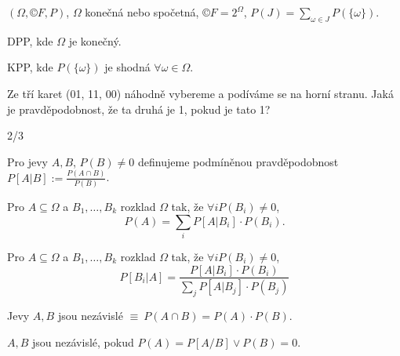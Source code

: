 \documentclass[12pt]{article}					%
\begin{document}
    \begin{definice}
        $(\Omega, ©F, P)$, $\Omega$ konečná nebo spočetná, $©F = 2^{\Omega}$, $P(J) = \sum_{\omega \in J} P(\{\omega\})$.
    \end{definice}

    \begin{definice}[Konečný PP]
        DPP, kde $\Omega$ je konečný.
    \end{definice}

    \begin{definice}[Klasický PP]
        KPP, kde $P(\{\omega\})$ je shodná $\forall \omega \in \Omega$.
    \end{definice}


    \begin{priklad}
        Ze tří karet (01, 11, 00) náhodně vybereme a podíváme se na horní stranu. Jaká je pravděpodobnost, že ta druhá je 1, pokud je tato 1?
        \begin{reseni}
            2/3
        \end{reseni}
    \end{priklad}

    \begin{definice}
        Pro jevy $A, B$, $P(B) ≠ 0$ definujeme podmíněnou pravděpodobnost $P[A|B] := \frac{P(A \cap B)}{P(B)}$.
    \end{definice}

    \begin{veta}
        Pro $A \subseteq \Omega$ a $B_1, …, B_k$ rozklad $\Omega$ tak, že $\forall i P(B_i) ≠ 0$,
        $$ P(A) = \sum_i P[A|B_i]·P(B_i). $$ 
    \end{veta}

    \begin{veta}[Bayesova]
        Pro $A \subseteq \Omega$ a $B_1, …, B_k$ rozklad $\Omega$ tak, že $\forall i P(B_i) ≠ 0$,
        $$ P[B_i|A] = \frac{P[A|B_i]·P(B_i)}{\sum_j P[A|B_j]·P(B_j)} $$ 
    \end{veta}
    
    \begin{definice}
        Jevy $A, B$ jsou nezávislé $≡\ P(A \cap B) = P(A)·P(B)$.
    \end{definice}

    \begin{poznamka}
        $A, B$ jsou nezávislé, pokud $P(A) = P[A/B] \lor P(B) = 0$.
    \end{poznamka}
\end{document}
